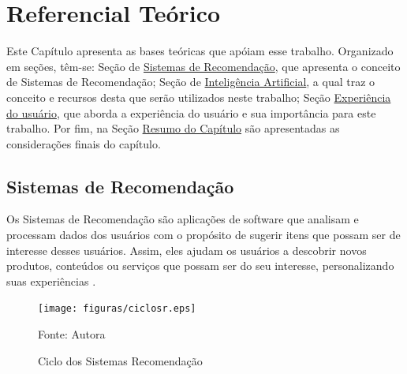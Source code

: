 \chapter[Referencial Teórico]{Referencial Teórico}\label{chap:refteor}
Este Capítulo apresenta as bases teóricas que apóiam esse trabalho. Organizado em seções, têm-se:
Seção de \hyperref[sec:sisrec]{Sistemas de Recomendação}, que apresenta o 
conceito de Sistemas de Recomendação; Seção de \hyperref[sec:ia]{Inteligência Artificial}, a qual traz 
o conceito e recursos desta que serão utilizados neste trabalho; Seção \hyperref[sec:expus]{Experiência do usuário},
que aborda a experiência do usuário e sua importância para este trabalho. Por fim, na Seção 
\hyperref[sec:resrefteor]{Resumo do Capítulo} são apresentadas as considerações finais
do capítulo.

\section{Sistemas de Recomendação}\label{sec:sisrec}

Os Sistemas de Recomendação são aplicações de software que analisam e processam dados dos usuários com o propósito de 
sugerir itens que possam ser de interesse desses usuários. Assim, eles ajudam os usuários a descobrir novos produtos, 
conteúdos ou serviços que possam ser do seu interesse, personalizando suas experiências \cite{pham2019recommendation}.

\begin{figure}[htbp]
    \centering
    \caption{Ciclo dos Sistemas Recomendação}
    \label{fig:ciclosr}
    
    \vspace{2pt} %
    
    \texttt{[image: figuras/ciclosr.eps]}
    
    \vspace{2pt} %
    
    \small Fonte: Autora
\end{figure}

